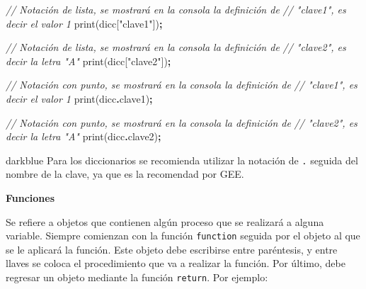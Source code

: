 \documentclass[
  12pt,
  letterpaper,
  twoside]{book}
\newenvironment{Shaded}{\begin{snugshade}}{\end{snugshade}}
\newcommand{\AttributeTok}[1]{\textcolor[rgb]{0.77,0.63,0.00}{#1}}
\newcommand{\CommentTok}[1]{\textcolor[rgb]{0.56,0.35,0.01}{\textit{#1}}}
\newcommand{\FunctionTok}[1]{\textcolor[rgb]{0.00,0.00,0.00}{#1}}
\newcommand{\NormalTok}[1]{#1}
\newcommand{\OperatorTok}[1]{\textcolor[rgb]{0.81,0.36,0.00}{\textbf{#1}}}
\newcommand{\StringTok}[1]{\textcolor[rgb]{0.31,0.60,0.02}{#1}}
\begin{document}
\begin{Shaded}
\begin{Highlighting}[]
\CommentTok{// Notación de lista, se mostrará en la consola la definición de }
\CommentTok{// "clave1", es decir el valor 1 }
\FunctionTok{print}\NormalTok{(dicc[}\StringTok{"clave1"}\NormalTok{])}\OperatorTok{;} 

\CommentTok{// Notación de lista, se mostrará en la consola la definición de }
\CommentTok{// "clave2", es decir la letra "A"}
\FunctionTok{print}\NormalTok{(dicc[}\StringTok{"clave2"}\NormalTok{])}\OperatorTok{;}  

\CommentTok{// Notación con punto, se mostrará en la consola la definición de }
\CommentTok{// "clave1", es decir el valor 1 }
\FunctionTok{print}\NormalTok{(dicc}\OperatorTok{.}\AttributeTok{clave1}\NormalTok{)}\OperatorTok{;}  

\CommentTok{// Notación con punto, se mostrará en la consola la definición de }
\CommentTok{// "clave2", es decir la letra "A"}
\FunctionTok{print}\NormalTok{(dicc}\OperatorTok{.}\AttributeTok{clave2}\NormalTok{)}\OperatorTok{;}  
\end{Highlighting}
\end{Shaded}

\begin{bluebox2}

\begin{awesomeblock}{5pt}{\faLightbulb}{darkblue}
Para los diccionarios se recomienda utilizar la notación de \texttt{.} seguida del nombre de la clave, ya que es la recomendad por GEE.

\end{awesomeblock}

\end{bluebox2}

\textbf{Funciones}

Se refiere a objetos que contienen algún proceso que se realizará a alguna variable. Siempre comienzan con la función \texttt{function} seguida por el objeto al que se le aplicará la función. Este objeto debe escribirse entre paréntesis, y entre llaves se coloca el procedimiento que va a realizar la función. Por último, debe regresar un objeto mediante la función \texttt{return}. Por ejemplo:
\end{document}
